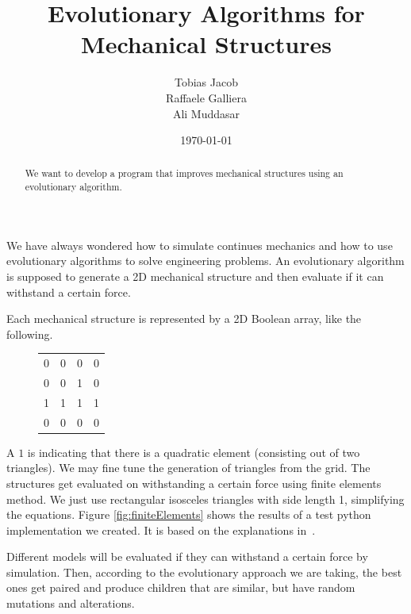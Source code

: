 \documentclass[12pt]{article}
\title{\vspace{-3em}Evolutionary Algorithms for Mechanical Structures}
\author{Tobias Jacob \\ Raffaele Galliera \\ Ali Muddasar}
\date{\today}
\begin{document}
\maketitle

\begin{abstract}
\centering
We want to develop a program that improves mechanical structures using an evolutionary algorithm.
\end{abstract}

We have always wondered how to simulate continues mechanics and how to use evolutionary algorithms to solve engineering problems. An evolutionary algorithm is supposed to generate a 2D mechanical structure and then evaluate if it can withstand a certain force.

\begin{figure}[h]
    \centering
\end{figure}

Each mechanical structure is represented by a 2D Boolean array, like the following.

\begin{figure}[h]
    \centering
    \begin{tabular}{cccc}
        0 & 0 & 0 & 0 \\
        0 & 0 & 1 & 0 \\
        1 & 1 & 1 & 1 \\
        0 & 0 & 0 & 0
    \end{tabular}
\end{figure}

A $1$ is indicating that there is a quadratic element (consisting out of two triangles). We may fine tune the generation of triangles from the grid. The structures get evaluated on withstanding a certain force using finite elements method. We just use rectangular isosceles triangles with side length 1, simplifying the equations. Figure \ref{fig:finiteElements} shows the results of a test python implementation we created. It is based on the explanations in~\cite[p. 15-22]{Nikishkov2004}.

Different models will be evaluated if they can withstand a certain force by simulation. Then, according to the evolutionary approach we are taking, the best ones get paired and produce children that are similar, but have random mutations and alterations.
\end{document}

